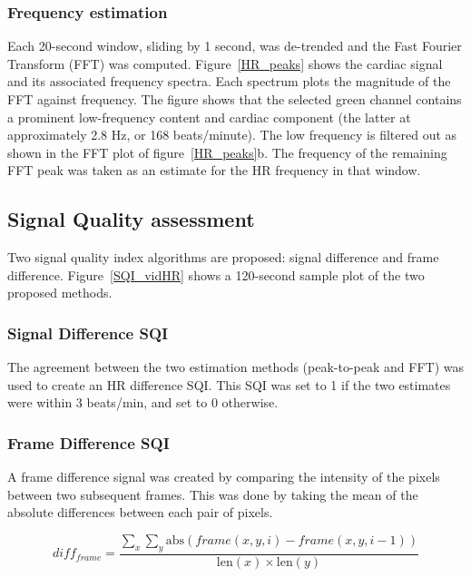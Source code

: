 \subsubsection{Frequency estimation}

Each 20-second window, sliding by 1 second, was de-trended and the Fast Fourier Transform (FFT) was computed. Figure~\ref{HR_peaks} shows the cardiac signal and its associated frequency spectra. Each spectrum plots the magnitude of the FFT against frequency. The figure shows that the selected green channel contains a prominent low-frequency content and cardiac component (the latter at approximately 2.8 Hz, or 168 beats/minute). The low frequency is filtered out as shown in the FFT plot of figure~\ref{HR_peaks}b. The frequency of the remaining FFT peak was taken as an estimate for the HR frequency in that window.

\subsection{Signal Quality assessment}
\label{sqis expl}

Two signal quality index algorithms are proposed: signal difference and frame difference. 
Figure~\ref{SQI_vidHR} shows a 120-second sample plot of the two proposed methods.

\subsubsection{Signal Difference SQI}

The agreement between the two estimation methods (peak-to-peak and FFT) was used to create an HR difference SQI. This SQI was set to 1 if the two estimates were within 3 beats/min, and set to 0 otherwise.

\subsubsection{Frame Difference SQI}

A frame difference signal was created by comparing the intensity of the pixels between two subsequent frames. This was done by taking the mean of the absolute differences between each pair of pixels. 

\begin{equation}
	diff_{frame} =\dfrac{\sum_{x}^{}\sum_{y}^{}\textrm{abs}(frame(x,y,i) - frame(x,y,i - 1))}{\textrm{len}(x) \times \textrm{len}(y)} 
\end{equation}

